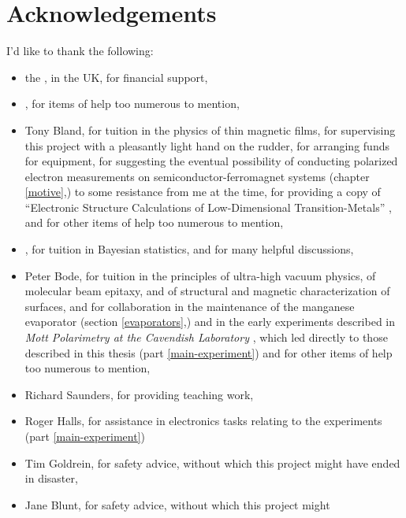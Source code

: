 \chapter*{Acknowledgements}

I'd like to thank the following:
\begin{itemize}
\item the , in the UK, for
  financial support,
\item {},
for items of help too numerous to mention,
\item{}Tony Bland, for tuition in the physics of thin magnetic films,
  for supervising this project with a pleasantly light hand on the
  rudder, for arranging funds for equipment, for suggesting the
  eventual possibility of conducting polarized electron measurements
  on semiconductor-ferromagnet systems (chapter \ref{motive},) to some
  resistance from me at the time, for providing a copy of ``Electronic
  Structure Calculations of Low-Dimensional Transition-Metals''
  \cite{Vega:2002:ESC}, and for other items of help too numerous to
  mention,
\item {}, for tuition
    in Bayesian statistics, and for many helpful discussions,
\item{}Peter Bode, for tuition in the principles of ultra-high vacuum
  physics, of molecular beam epitaxy, and of structural and magnetic
  characterization of surfaces, and for collaboration in the
  maintenance of the manganese evaporator (section \ref{evaporators},)
  and in the early experiments described in \emph{Mott Polarimetry at
  the Cavendish Laboratory} \cite{Hatton:2000:MPC}, which led directly
  to those described in this thesis (part \ref{main-experiment}) and
  for other items of help too numerous to mention,
\item{}Richard Saunders, for providing teaching work,
\item{}Roger Halls, for assistance in electronics tasks relating to
  the experiments (part \ref{main-experiment})
\item{}Tim Goldrein, for safety advice, without which this project
  might have ended in disaster,
\item{}Jane Blunt, for safety advice, without which this project might

\end{itemize}

